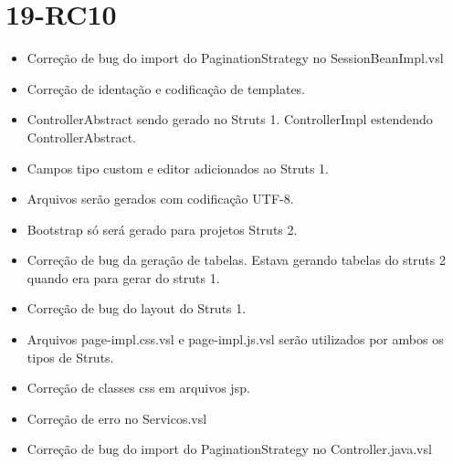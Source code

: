 \section{19-RC10}

\begin{itemize}
  \item Correção de bug do import do PaginationStrategy no SessionBeanImpl.vsl
  \item Correção de identação e codificação de templates.
  \item ControllerAbstract sendo gerado no Struts 1. ControllerImpl estendendo ControllerAbstract.
  \item Campos tipo custom e editor adicionados ao Struts 1.
  \item Arquivos serão gerados com codificação UTF-8.
  \item Bootstrap só será gerado para projetos Struts 2.
  \item Correção de bug da geração de tabelas. Estava gerando tabelas do struts 2 quando era para gerar do struts 1.
  \item Correção de bug do layout do Struts 1.
  \item Arquivos page-impl.css.vsl e page-impl.js.vsl serão utilizados por ambos os tipos de Struts.
  \item Correção de classes css em arquivos jsp.
  \item Correção de erro no Servicos.vsl
  \item Correção de bug do import do PaginationStrategy no Controller.java.vsl
\end{itemize}